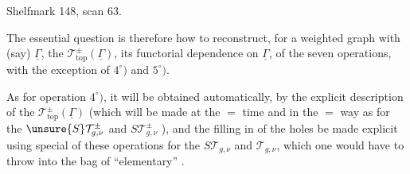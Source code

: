 Shelfmark 148, scan 63.


The essential question is therefore how to reconstruct, for a weighted graph \deleted{$\unsure{\Gamma}$} with
  (say) $\underline\Gamma$, the
 $\mathcal T_{\mathrm{top}}^\pm(\underline\Gamma)$,
  its functorial dependence on $\underline\Gamma$,
 
of the seven operations, with the exception of $4^\circ)$ and $5^\circ)$.

As for operation $4^\circ)$, it will be obtained automatically, by the explicit description of the
$\mathcal T_{\mathrm{top}}^\pm(\underline\Gamma)$
(which will be made at the $=$ time and in the $=$ way as for the $\unsure{S}\mathcal T_{g,\nu}^\pm$ and $S\mathcal T_{g,\nu}^\pm$ ),
and the filling in of the holes  be made explicit using  special  of these operations for the
$S\mathcal T_{g,\nu}$ and $\mathcal T_{g,\nu}$, which one would have to throw into the bag of
``elementary''   .

\deleted{$(**)$}\quad
{}
